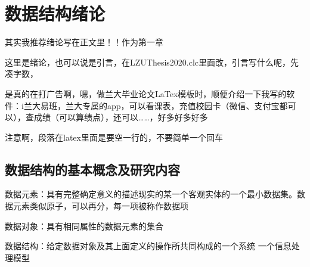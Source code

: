 \documentclass[AutoFakeBold]{LZUThesis2007}
\begin{document}
\tableofcontents


\mainmatter

\chapter{数据结构绪论}

其实我推荐绪论写在正文里！！作为第一章

    这里是绪论，也可以说是引言，在LZUThesis2020.clc里面改，引言写什么呢，先凑字数，

    是真的在打广告啊，嗯，做兰大毕业论文LaTex模板时，顺便介绍一下我写的软件：i兰大易班，兰大专属的app，可以看课表，充值校园卡（微信、支付宝都可以），查成绩（可以算绩点），还可以……，好多好多好多

    注意啊，段落在latex里面是要空一行的，不要简单一个回车

    \section{数据结构的基本概念及研究内容}

	数据元素：具有完整确定意义的描述现实的某一个客观实体的一个最小数据集。数据元素类似原子，可以再分，每一项被称作数据项

	数据对象：具有相同属性的数据元素的集合

	数据结构：给定数据对象及其上面定义的操作所共同构成的一个系统 一个信息处理模型
\end{document}
